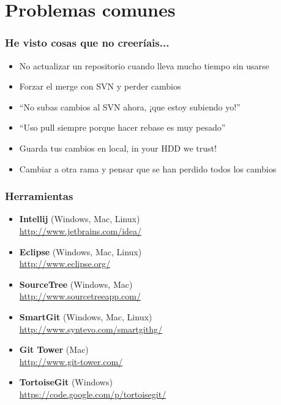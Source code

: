 \section{Problemas comunes}
\frame
{
\frametitle{He visto cosas que no creeríais...}
\begin{itemize}
\item No actualizar un repositorio cuando lleva mucho tiempo sin usarse
\item Forzar el merge con SVN y perder cambios
\item ``No subas cambios al SVN ahora, ¡que estoy subiendo yo!''
\item ``Uso pull siempre porque hacer rebase es muy pesado''
\item Guarda tus cambios en local, in your HDD we trust!
\item Cambiar a otra rama y pensar que se han perdido todos los cambios
\end{itemize}
}

\usebackgroundtemplate{}
\frame
{
\frametitle{Herramientas}
\begin{itemize}
 \item \textbf{Intellij} (Windows, Mac, Linux)\\ \url{http://www.jetbrains.com/idea/}
 \item \textbf{Eclipse} (Windows, Mac, Linux)\\ \url{http://www.eclipse.org/}
 \item \textbf{SourceTree} (Windows, Mac)\\ \url{http://www.sourcetreeapp.com/}
 \item \textbf{SmartGit} (Windows, Mac, Linux)\\ \url{http://www.syntevo.com/smartgithg/}
 \item \textbf{Git Tower} (Mac)\\ \url{http://www.git-tower.com/}
 \item \textbf{TortoiseGit} (Windows)\\ \url{https://code.google.com/p/tortoisegit/}
\end{itemize}
}